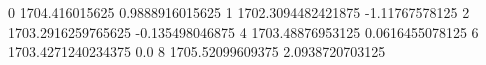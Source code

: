 0 1704.416015625 0.9888916015625
1 1702.3094482421875 -1.11767578125
2 1703.2916259765625 -0.135498046875
4 1703.48876953125 0.0616455078125
6 1703.4271240234375 0.0
8 1705.52099609375 2.0938720703125
